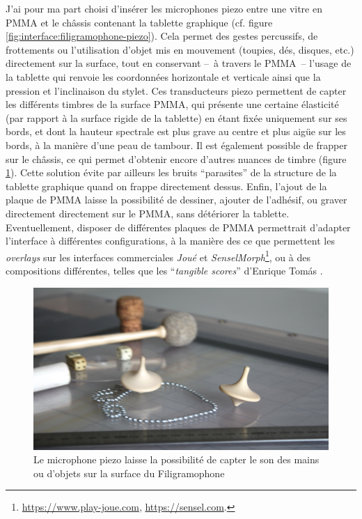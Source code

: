 \indent J'ai pour ma part choisi d'insérer les microphones piezo entre une vitre en \gls{PMMA} et le châssis contenant la tablette graphique (cf. figure \ref{fig:interface:filigramophone-piezo}). Cela permet des gestes percussifs, de frottements ou l'utilisation d'objet mis en mouvement (toupies, dés, disques, etc.) directement sur la surface, tout en conservant --~à travers le \gls{PMMA}~-- l'usage de la tablette qui renvoie les coordonnées horizontale et verticale ainsi que la pression et l'inclinaison du stylet. Ces transducteurs piezo permettent de capter les différents timbres de la surface \gls{PMMA}, qui présente une certaine élasticité (par rapport à la surface rigide de la tablette) en étant fixée uniquement sur ses bords, et dont la hauteur spectrale est plus grave au centre et plus aigüe sur les bords, à la manière d'une peau de tambour. Il est également possible de frapper sur le châssis, ce qui permet d'obtenir encore d'autres nuances de timbre (figure \ref{fig:interface:filigramophone-toupie}). Cette solution évite par ailleurs les bruits ``parasites'' de la structure de la tablette graphique quand on frappe directement dessus. Enfin, l'ajout de la plaque de \gls{PMMA} laisse la possibilité de dessiner, ajouter de l'adhésif, ou graver directement directement sur le \gls{PMMA}, sans détériorer la tablette. Eventuellement, disposer de différentes plaques de \gls{PMMA} permettrait d'adapter l'interface à différentes configurations, à la manière des ce que permettent les \textit{overlays} sur les interfaces commerciales \textit{Joué} et \textit{SenselMorph}\footnote{\url{https://www.play-joue.com}, \url{https://sensel.com}.}, ou à des compositions différentes, telles que les ``\textit{tangible scores}'' d'Enrique Tomás \cite{tomas_tangible_2014}.

\begin{figure}[!htbp]
	\captionsetup{format=plain}%
	\includegraphics[width=\textwidth]{gfx/05_interfaces/filigramophone-toupie.jpg}
	\caption[Captation du son sur la surface du Filigramophone]{Le microphone piezo laisse la possibilité de capter le son des mains ou d'objets sur la surface du Filigramophone}
	\label{fig:interface:filigramophone-toupie}
\end{figure}

